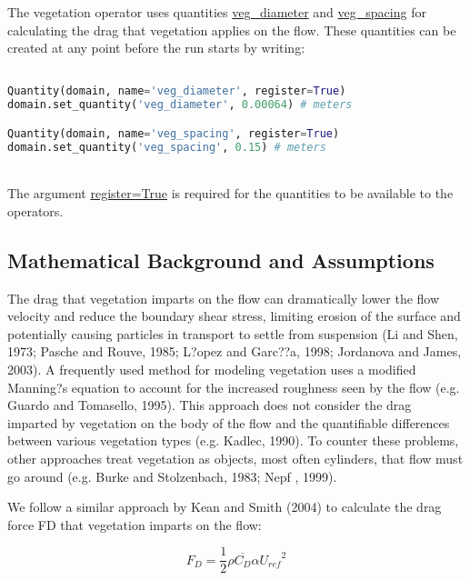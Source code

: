 \documentclass[10pt]{article}
\begin{document}
The vegetation operator uses quantities \url{veg_diameter} and \url{veg_spacing} for calculating the drag that vegetation applies on the flow. These quantities can be created at any point before the run starts by writing:

\begin{minipage}[c]{0.95\textwidth}
\begin{lstlisting}[language=Python, title=Creating vegetation quantities]

Quantity(domain, name='veg_diameter', register=True)
domain.set_quantity('veg_diameter', 0.00064) # meters

Quantity(domain, name='veg_spacing', register=True)
domain.set_quantity('veg_spacing', 0.15) # meters

\end{lstlisting}
\end{minipage}
\ \\

The argument \url{register=True} is required for the quantities to be available to the operators.

\subsection{Mathematical Background and Assumptions}

The drag that vegetation imparts on the flow can dramatically lower the flow velocity and reduce the boundary shear stress, limiting erosion of the surface and potentially causing particles in transport to settle from suspension (Li and Shen, 1973; Pasche and Rouve, 1985; L?opez and Garc??a, 1998; Jordanova and James, 2003). A frequently used method for modeling vegetation uses a modified Manning?s equation to account for the increased roughness seen by the flow (e.g. Guardo and Tomasello, 1995). This approach does not consider the drag imparted by vegetation on the body of the flow and the quantifiable differences between various vegetation types (e.g. Kadlec, 1990). To counter these problems, other approaches treat vegetation as objects, most often cylinders, that flow must go around (e.g. Burke and Stolzenbach, 1983; Nepf , 1999).

We follow a similar approach by Kean and Smith (2004) to calculate the drag force FD that vegetation imparts on the flow:

\begin{equation}
F_D = \frac{1}{2} \rho \overline{C_D} \alpha {U_{ref}}^2
\end{equation}
\end{document}
